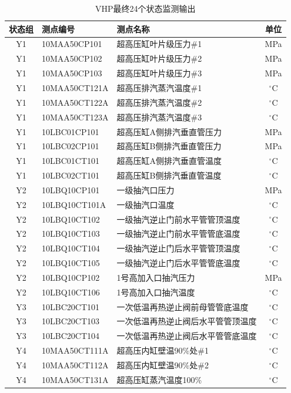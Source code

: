 \begin{table}[htbp]
\centering
\caption{VHP最终24个状态监测输出}
\label{tab:vhp_outputs}
\scriptsize
\begin{tabular}{cllc}
\toprule
状态组 & 测点编号 & 测点名称 & 单位\\
\midrule
Y1 & 10MAA50CP101 & 超高压缸叶片级压力\#1 & MPa\\
Y1 & 10MAA50CP102 & 超高压缸叶片级压力\#2 & MPa\\
Y1 & 10MAA50CP103 & 超高压缸叶片级压力\#3 & MPa\\
Y1 & 10MAA50CT121A & 超高压排汽蒸汽温度\#1 & $^{\circ}$C\\
Y1 & 10MAA50CT122A & 超高压排汽蒸汽温度\#2 & $^{\circ}$C\\
Y1 & 10MAA50CT123A & 超高压排汽蒸汽温度\#3 & $^{\circ}$C\\
Y1 & 10LBC01CP101 & 超高压缸A侧排汽垂直管压力 & MPa\\
Y1 & 10LBC02CP101 & 超高压缸B侧排汽垂直管压力 & MPa\\
Y1 & 10LBC01CT101 & 超高压缸A侧排汽垂直管温度 & $^{\circ}$C\\
Y1 & 10LBC02CT101 & 超高压缸B侧排汽垂直管温度 & $^{\circ}$C\\
Y2 & 10LBQ10CP101 & 一级抽汽口压力 & MPa\\
Y2 & 10LBQ10CT101A & 一级抽汽口温度 & $^{\circ}$C\\
Y2 & 10LBQ10CT102 & 一级抽汽逆止门前水平管管顶温度 & $^{\circ}$C\\
Y2 & 10LBQ10CT103 & 一级抽汽逆止门前水平管管底温度 & $^{\circ}$C\\
Y2 & 10LBQ10CT104 & 一级抽汽逆止门后水平管管顶温度 & $^{\circ}$C\\
Y2 & 10LBQ10CT105 & 一级抽汽逆止门后水平管管底温度 & $^{\circ}$C\\
Y2 & 10LBQ10CP102 & 1号高加入口抽汽压力 & MPa\\
Y2 & 10LBQ10CT106 & 1号高加入口抽汽温度 & $^{\circ}$C\\
Y3 & 10LBC20CT101 & 一次低温再热逆止阀前母管管底温度 & $^{\circ}$C\\
Y3 & 10LBC20CT103 & 一次低温再热逆止阀后水平管管顶温度 & $^{\circ}$C\\
Y3 & 10LBC20CT104 & 一次低温再热逆止阀后水平管管底温度 & $^{\circ}$C\\
Y4 & 10MAA50CT111A & 超高压内缸壁温90\%处\#1 & $^{\circ}$C\\
Y4 & 10MAA50CT112A & 超高压内缸壁温90\%处\#2 & $^{\circ}$C\\
Y4 & 10MAA50CT131A & 超高压缸蒸汽温度100\% & $^{\circ}$C\\
\bottomrule
\end{tabular}
\end{table}

